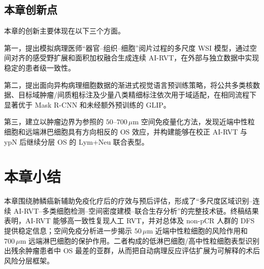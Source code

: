 \subsection{本章创新点}
本章的创新主要体现在以下三个方面。

第一，提出模拟病理医师“器官--组织--细胞”阅片过程的多尺度 WSI 模型，通过空间对齐的感受野扩展和面积加权融合生成连续 AI-RVT，在外部与独立数据中实现稳定的患者级一致性。

第二，提出面向异构病理细胞数据的渐进式视觉语言预训练策略，将公共多类核数据、目标域肿瘤/间质粗标注及少量八类精细标注依次用于域适配，在相同流程下显著优于 Mask R-CNN 和未经额外预训练的 GLIP。

第三，建立以肿瘤边界为参照的 $50$--$700\,\mu\mathrm{m}$ 空间免疫量化方法，发现近端中性粒细胞和远端淋巴细胞具有方向相反的 OS 效应，并构建能够在校正 AI-RVT 与 ypN 后继续分层 OS 的 Lym+Neu 联合表型。

\section{本章小结}
本章围绕肺鳞癌新辅助免疫化疗后的疗效与预后评估，形成了“多尺度区域识别--连续 AI-RVT--多类细胞检测--空间密度建模--联合生存分析”的完整技术链。终稿结果表明，AI-RVT 能够高一致性复现人工 RVT，并对总体及 non-pCR 人群的 DFS 提供稳定信息；空间免疫分析进一步揭示 $50\,\mu\mathrm{m}$ 近端中性粒细胞的风险作用和 $700\,\mu\mathrm{m}$ 远端淋巴细胞的保护作用。二者构成的低淋巴细胞/高中性粒细胞表型识别出残余肿瘤患者中 OS 最差的亚群，从而把自动病理反应评估扩展为可解释的术后风险分层框架。

